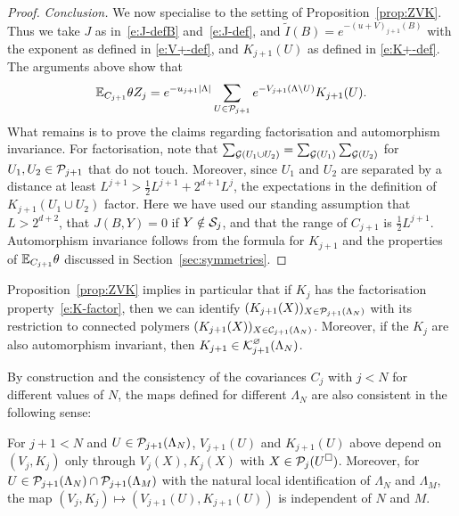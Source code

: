 \documentclass[11pt]{amsart}
\numberwithin{equation}{section}
\numberwithin{theorem}{section}
\newcommand{\1}{{\bf 1}}
\newcommand{\cKbulk}{\cK^\varnothing}
\begin{document}
\begin{proof}
\smallskip
\noindent
\emph{Conclusion.}
We now specialise to the setting of Proposition~\ref{prop:ZVK}.
Thus we take $J$ as in~\eqref{e:J-defB} and~\eqref{e:J-def}, and
$\tilde I(B)= e^{-(u+V)_{j+1}(B)}$ with the exponent as
defined in \eqref{e:V+-def}, and  $K_{j+1}(U)$ as defined in \eqref{e:K+-def}.
The arguments above show that 
\begin{equation}
  \mathbb{E}_{C_{j+1}} \theta Z_j=e^{-u_{j+1}|\Lambda|}\sum_{U \in \mathcal P_{j+1}} e^{-V_{j+1}(\Lambda\setminus U)} K_{j+1}(U).
\end{equation}
%
What remains is to prove the claims regarding factorisation and
automorphism invariance. For factorisation, note that
$\sum_{\mathcal G(U_{1}\cup U_{2})} = \sum_{\mathcal G(U_{1})}\sum_{\mathcal G(U_{2})}$ for
$U_{1},U_{2}\in \mathcal P_{j+1}$ that do not touch. Moreover, since $U_{1}$
and $U_{2}$ are separated by a distance at least
$L^{j+1}>\frac{1}{2}L^{j+1}+2^{d+1}L^{j}$, the expectations in the
definition of $K_{j+1}(U_{1}\cup U_{2})$ factor.  Here we have used
our standing assumption that $L>2^{d+2}$, that $J(B,Y)=0$ if
$Y\notin \mathcal S_{j}$, and that the range of $C_{j+1}$ is
$\frac{1}{2}L^{j+1}$.
%
Automorphism invariance follows from the formula for $K_{j+1}$ and the
properties of $\mathbb{E}_{C_{j+1}}\theta$ discussed in
Section~\ref{sec:symmetries}.
\end{proof}

Proposition~\ref{prop:ZVK} implies in particular that if
$K_{j}$ has the factorisation property~\eqref{e:K-factor}, then we can identify
$(K_{j+1}(X))_{X\in\mathcal P_{j+1}(\Lambda_{N})}$ with its restriction to connected polymers
$(K_{j+1}(X))_{X\in\mathcal C_{j+1}(\Lambda_{N})}$.
Moreover, if the $K_{j}$ are also automorphism invariant, then $K_{j+1}\in\cKbulk_{j+1}(\Lambda_{N})$.

By construction and the consistency of the covariances $C_j$ with
$j<N$ for different values of $N$, the maps defined for different
$\Lambda_N$ are also consistent in the following sense:

\begin{proposition} \label{prop:consistency} For $j+1<N$ and
  $U \in \mathcal P_{j+1}(\Lambda_N)$, $V_{j+1}(U)$ and $K_{j+1}(U)$ above
  depend on $(V_j,K_j)$ only through $V_j(X),K_j(X)$ with
  $X \in \mathcal P_j(U^\square)$.  Moreover, for
  $U \in \mathcal P_{j+1}(\Lambda_N) \cap \mathcal P_{j+1}(\Lambda_{M})$ with the
  natural local identification of $\Lambda_N$ and $\Lambda_M$, the map
  $(V_j,K_j) \mapsto (V_{j+1}(U),K_{j+1}(U))$ is independent of $N$
  and $M$.
\end{proposition}
\end{document}
